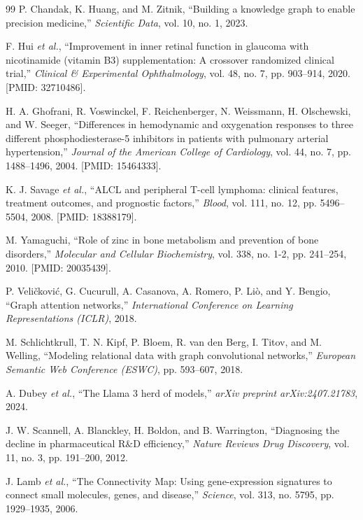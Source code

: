 \documentclass[conference,a4paper]{IEEEtran}
\begin{document}
\begin{thebibliography}{99}
 P. Chandak, K. Huang, and M. Zitnik, 
``Building a knowledge graph to enable precision medicine,'' 
\textit{Scientific Data}, vol. 10, no. 1, 2023.

 F. Hui \textit{et al.}, 
``Improvement in inner retinal function in glaucoma with nicotinamide (vitamin B3) supplementation: A crossover randomized clinical trial,'' 
\textit{Clinical \& Experimental Ophthalmology}, vol. 48, no. 7, pp. 903--914, 2020. [PMID: 32710486].

 H. A. Ghofrani, R. Voswinckel, F. Reichenberger, N. Weissmann, H. Olschewski, and W. Seeger, 
``Differences in hemodynamic and oxygenation responses to three different phosphodiesterase-5 inhibitors in patients with pulmonary arterial hypertension,'' 
\textit{Journal of the American College of Cardiology}, vol. 44, no. 7, pp. 1488--1496, 2004. [PMID: 15464333].

 K. J. Savage \textit{et al.}, 
``ALCL and peripheral T-cell lymphoma: clinical features, treatment outcomes, and prognostic factors,'' 
\textit{Blood}, vol. 111, no. 12, pp. 5496--5504, 2008. [PMID: 18388179].

 M. Yamaguchi, 
``Role of zinc in bone metabolism and prevention of bone disorders,'' 
\textit{Molecular and Cellular Biochemistry}, vol. 338, no. 1-2, pp. 241--254, 2010. [PMID: 20035439].

 P. Veli{\v{c}}kovi{\'c}, G. Cucurull, A. Casanova, A. Romero, P. Li{\`o}, and Y. Bengio, 
``Graph attention networks,''
\textit{International Conference on Learning Representations (ICLR)}, 2018.

 M. Schlichtkrull, T. N. Kipf, P. Bloem, R. van den Berg, I. Titov, and M. Welling, 
``Modeling relational data with graph convolutional networks,'' 
\textit{European Semantic Web Conference (ESWC)}, pp. 593--607, 2018.

 A. Dubey \textit{et al.}, 
``The Llama 3 herd of models,''
\textit{arXiv preprint arXiv:2407.21783}, 2024.


 J. W. Scannell, A. Blanckley, H. Boldon, and B. Warrington, 
``Diagnosing the decline in pharmaceutical R\&D efficiency,''
\textit{Nature Reviews Drug Discovery}, vol. 11, no. 3, pp. 191--200, 2012.

 J. Lamb \textit{et al.}, 
``The Connectivity Map: Using gene-expression signatures to connect small molecules, genes, and disease,''
\textit{Science}, vol. 313, no. 5795, pp. 1929--1935, 2006.


\end{thebibliography}
\end{document}
